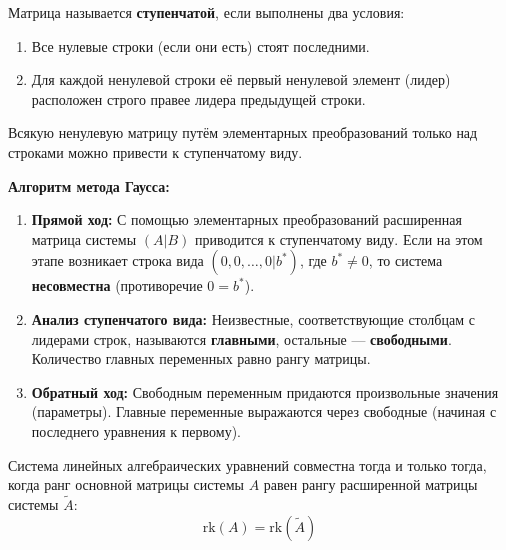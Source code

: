 \begin{definition}
Матрица называется \textbf{ступенчатой}, если выполнены два условия:
\begin{enumerate}
    \item Все нулевые строки (если они есть) стоят последними.
    \item Для каждой ненулевой строки её первый ненулевой элемент (лидер) расположен строго правее лидера предыдущей строки.
\end{enumerate}
\end{definition}

\begin{theorem}
Всякую ненулевую матрицу путём элементарных преобразований только над строками можно привести к ступенчатому виду.
\end{theorem}

\textbf{Алгоритм метода Гаусса:}
\begin{enumerate}
    \item \textbf{Прямой ход:} С помощью элементарных преобразований расширенная матрица системы $(A|B)$ приводится к ступенчатому виду. Если на этом этапе возникает строка вида $(0, 0, \dots, 0 | b^*)$, где $b^* \neq 0$, то система \textbf{несовместна} (противоречие $0 = b^*$).
    \item \textbf{Анализ ступенчатого вида:} Неизвестные, соответствующие столбцам с лидерами строк, называются \textbf{главными}, остальные — \textbf{свободными}. Количество главных переменных равно рангу матрицы.
    \item \textbf{Обратный ход:} Свободным переменным придаются произвольные значения (параметры). Главные переменные выражаются через свободные (начиная с последнего уравнения к первому).
\end{enumerate}

\begin{theorem}
Система линейных алгебраических уравнений совместна тогда и только тогда, когда ранг основной матрицы системы $A$ равен рангу расширенной матрицы системы $\tilde{A}$:
\[ \mathrm{rk}(A) = \mathrm{rk}(\tilde{A}) \]
\end{theorem}

